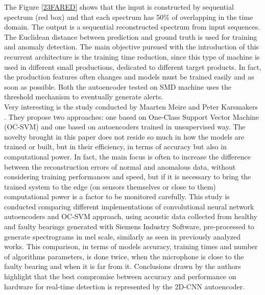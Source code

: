 The Figure \ref{23FARED} shows that the input is constructed by sequential spectrum (red box) and that each spectrum has 50\% of overlapping in the time domain. The output is a sequential reconstructed spectrum from input sequences. The Euclidean distance between prediction and ground truth is used for training and anomaly detection. The main objective pursued with the introduction of this recurrent architecture is the training time reduction, since this type of machine is used in different small productions, dedicated to different target products. In fact, the production features often changes and models must be trained easily and as soon as possible. Both the autoencoder tested on SMD machine uses the threshold mechanism to eventually generate alerts.\\
Very interesting is the study conducted by Maarten Meire and Peter Karsmakers \cite{24ComparisonDeepAutoencodersRealTime}. They propose two approaches: one based on One-Class Support Vector Machine (OC-SVM) and one based on autoencoders trained in unsupervised way. The novelty brought in this paper does not reside so much in how the models are trained or built, but in their efficiency, in terms of accuracy but also in computational power. In fact, the main focus is often to increase the difference between the reconstruction errors of normal and anomalous data, without considering training performances and speed, but if it is necessary to bring the trained system to the edge (on sensors themselves or close to them) computational power is a factor to be monitored carefully. This study is conducted comparing different implementations of convolutional neural network autoencoders and OC-SVM approach, using acoustic data collected from healthy and faulty bearings generated with Siemens Industry Software, pre-processed to generate spectrograms in mel scale, similarly as seen in previously analyzed works. This comparison, in terms of models accuracy, training times and number of algorithms parameters, is done twice, when the microphone is close to the faulty bearing and when it is far from it. Conclusions drawn by the authors highlight that the best compromise between accuracy and performance on hardware for real-time detection is represented by the 2D-CNN autoencoder.\\
